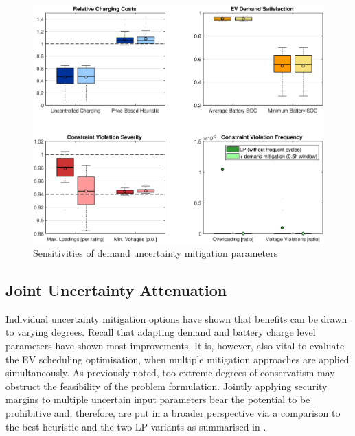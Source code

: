 \begin{figure}[]
	\includegraphics[width=.98\textwidth,trim={2.9cm 1.7cm 2.5cm 0.9cm},clip]{figures/evaluation/lp_dem.eps}
	\caption{Sensitivities of demand uncertainty mitigation parameters}
	\label{fig:lpdem}
\end{figure}

\subsection{Joint Uncertainty Attenuation}
\label{sec:joint}

Individual uncertainty mitigation options have shown that benefits can be drawn to varying degrees. Recall that adapting demand and battery charge level parameters have shown most improvements. It is, however, also vital to evaluate the EV scheduling optimisation, when multiple mitigation approaches are applied simultaneously. As previously noted, too extreme degrees of conservatism may obstruct the feasibility of the problem formulation. Jointly applying security margins to multiple uncertain input parameters bear the potential to be prohibitive and, therefore, are put in a broader perspective via a comparison to the best heuristic and the two LP variants as summarised in .

